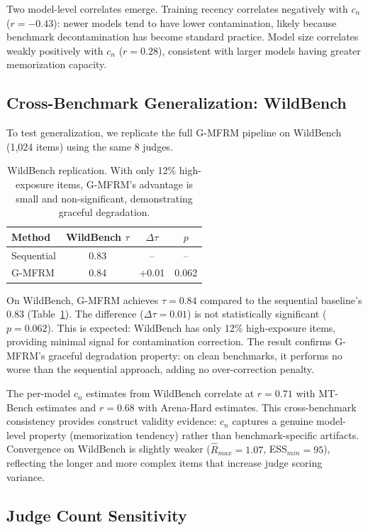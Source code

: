\documentclass[11pt]{article}
\begin{document}
Two model-level correlates emerge. Training recency correlates negatively with $c_n$ ($r = -0.43$): newer models tend to have lower contamination, likely because benchmark decontamination has become standard practice. Model size correlates weakly positively with $c_n$ ($r = 0.28$), consistent with larger models having greater memorization capacity.

\subsection{Cross-Benchmark Generalization: WildBench}
\label{sec:wildbench}

To test generalization, we replicate the full G-MFRM pipeline on WildBench (1,024 items) using the same 8 judges.

\begin{table}[t]
\centering
\caption{WildBench replication. With only 12\% high-exposure items, G-MFRM's advantage is small and non-significant, demonstrating graceful degradation.}
\label{tab:wildbench}
\begin{tabular}{lccc}
\toprule
Method & WildBench $\tau$ & $\Delta\tau$ & $p$ \\
\midrule
Sequential & 0.83 & -- & -- \\
G-MFRM & 0.84 & +0.01 & 0.062 \\
\bottomrule
\end{tabular}
\end{table}

On WildBench, G-MFRM achieves $\tau = 0.84$ compared to the sequential baseline's 0.83 (Table~\ref{tab:wildbench}). The difference ($\Delta\tau = 0.01$) is not statistically significant ($p = 0.062$). This is expected: WildBench has only 12\% high-exposure items, providing minimal signal for contamination correction. The result confirms G-MFRM's graceful degradation property: on clean benchmarks, it performs no worse than the sequential approach, adding no over-correction penalty.

The per-model $c_n$ estimates from WildBench correlate at $r = 0.71$ with MT-Bench estimates and $r = 0.68$ with Arena-Hard estimates. This cross-benchmark consistency provides construct validity evidence: $c_n$ captures a genuine model-level property (memorization tendency) rather than benchmark-specific artifacts. Convergence on WildBench is slightly weaker ($\hat{R}_{max} = 1.07$, ESS$_{min} = 95$), reflecting the longer and more complex items that increase judge scoring variance.

\subsection{Judge Count Sensitivity}
\label{sec:judge_sensitivity}
\end{document}
